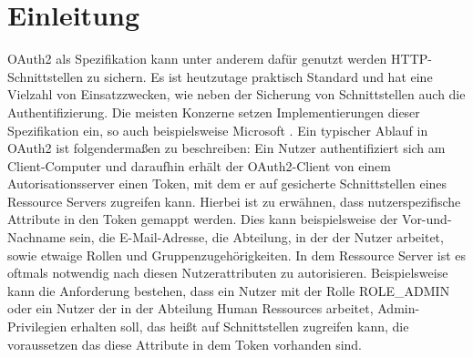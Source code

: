 \chapter{Einleitung}
\label{ch:intro}
OAuth2 als Spezifikation kann unter anderem dafür genutzt werden \ac{HTTP}-Schnittstellen zu sichern. Es ist heutzutage praktisch Standard und hat eine Vielzahl von Einsatzzwecken, wie neben der Sicherung von Schnittstellen auch die Authentifizierung. Die meisten Konzerne setzen Implementierungen dieser Spezifikation ein, so auch beispielsweise Microsoft \citep{microsoftoauth2:2021:07}. Ein typischer Ablauf in OAuth2 ist folgendermaßen zu beschreiben: Ein Nutzer authentifiziert sich am Client-Computer und daraufhin erhält der OAuth2-Client von einem Autorisationsserver einen Token, mit dem er auf gesicherte Schnittstellen eines Ressource Servers zugreifen kann. Hierbei ist zu erwähnen, dass nutzerspezifische Attribute in den Token gemappt werden. Dies kann beispielsweise der Vor-und-Nachname sein, die E-Mail-Adresse, die Abteilung, in der der Nutzer arbeitet, sowie etwaige Rollen und Gruppenzugehörigkeiten. In dem Ressource Server ist es oftmals notwendig nach diesen Nutzerattributen zu autorisieren. Beispielsweise kann die Anforderung bestehen, dass ein Nutzer mit der Rolle ROLE\_ADMIN oder ein Nutzer der in der Abteilung Human Ressources arbeitet, Admin-Privilegien erhalten soll, das heißt auf Schnittstellen zugreifen kann, die voraussetzen das diese Attribute in dem Token vorhanden sind.\smallskip

